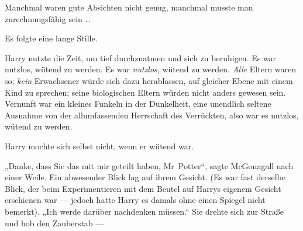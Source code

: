 Manchmal waren gute Absichten nicht genug, manchmal musste man zurechnungsfähig sein …

Es folgte eine lange Stille.

Harry nutzte die Zeit, um tief durchzuatmen und sich zu beruhigen. Es war nutzlos, wütend zu werden. Es war \emph{nutzlos}, wütend zu werden. \emph{Alle} Eltern waren so; \emph{kein} Erwachsener würde sich dazu herablassen, auf gleicher Ebene mit einem Kind zu sprechen; seine biologischen Eltern würden nicht anders gewesen sein. Vernunft war ein kleines Funkeln in der Dunkelheit, eine unendlich seltene Ausnahme von der allumfassenden Herrschaft des Verrückten, also war es nutzlos, wütend zu werden.

Harry mochte sich selbst nicht, wenn er wütend war.

„Danke, dass Sie das mit mir geteilt haben, Mr~Potter“, sagte McGonagall nach einer Weile. Ein abwesender Blick lag auf ihrem Gesicht. (Es war fast derselbe Blick, der beim Experimentieren mit dem Beutel auf Harrys eigenem Gesicht erschienen war — jedoch hatte Harry es damals ohne einen Spiegel nicht bemerkt).
„Ich werde darüber nachdenken müssen.“ Sie drehte sich zur Straße und hob den Zauberstab —

